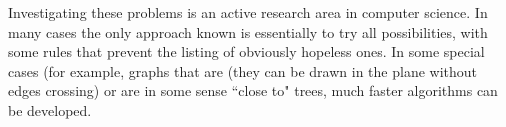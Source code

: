 Investigating these problems is an active research area in computer
science. In many cases the only approach known is essentially to try
all possibilities, with some rules that prevent the listing of obviously
hopeless ones. In some special cases (for example, graphs that are 
 (they can be drawn in the plane without edges crossing) 
or are in some sense ``close to" trees, much faster algorithms can be developed.

%
%

%

